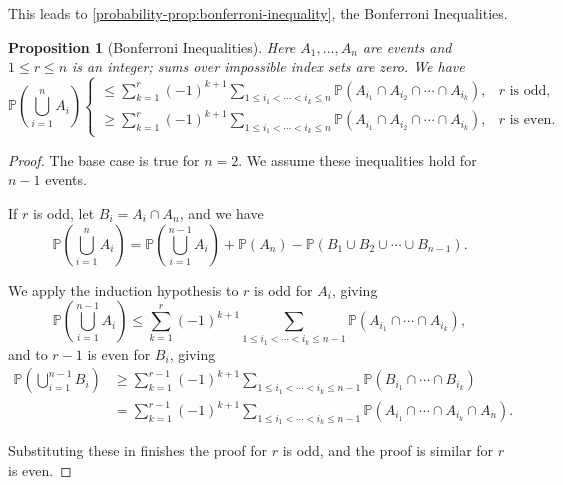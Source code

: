 \documentclass[11pt]{article}
\numberwithin{equation}{section}
\newtheorem{proposition}[theorem]{Proposition}
\theoremstyle{definition}
\theoremstyle{remark}
\newcommand{\pqty}[1]{\left(#1\right)}
\newcommand{\Prob}{\mathbb P}
\begin{document}
This leads to \autoref{probability-prop:bonferroni-inequality}, the Bonferroni Inequalities.

\begin{proposition}[Bonferroni Inequalities]\label{probability-proposition-004}
    \label{probability-prop:bonferroni-inequality}
Here \(A_1,\ldots,A_n\) are events and \(1\le r\le n\) is an integer; sums over impossible index sets are zero.
%
    We have
    \[
        \Prob\pqty{\bigcup_{i = 1}^{n} A_i} \begin{cases}
            \leq \sum_{k = 1}^{r} \pqty{-1}^{k + 1} \sum_{1 \leq i_1 < \cdots < i_k \leq n} \Prob\pqty{A_{i_1} \cap A_{i_2} \cap \cdots \cap A_{i_k}}, & r \text{ is odd}, \\
            \geq \sum_{k = 1}^{r} \pqty{-1}^{k + 1} \sum_{1 \leq i_1 < \cdots < i_k \leq n} \Prob\pqty{A_{i_1} \cap A_{i_2} \cap \cdots \cap A_{i_k}}, & r \text{ is even}.
        \end{cases}
    \]
\end{proposition}

\begin{proof}\label{probability-proof-012}
    The base case is true for \(n = 2\). We assume these inequalities hold for \(n - 1\) events.

    If \(r\) is odd, let \(B_i = A_i \cap A_n\), and we have
    \[
        \Prob\pqty{\bigcup_{i = 1}^{n} A_i} = \Prob\pqty{\bigcup_{i = 1}^{n - 1} A_i} + \Prob\pqty{A_n} - \Prob\pqty{B_1 \cup B_2 \cup \cdots \cup B_{n - 1}}.
    \]

    We apply the induction hypothesis to \(r\) is odd for \(A_i\), giving
    \[
        \Prob\pqty{\bigcup_{i = 1}^{n - 1} A_i} \leq \sum_{k = 1}^{r} \pqty{-1}^{k + 1} \sum_{1 \leq i_1 < \cdots < i_k \leq n - 1} \Prob\pqty{A_{i_1} \cap \cdots \cap A_{i_k}},
    \]
    and to \(r - 1\) is even for \(B_i\), giving
    \begin{align*}
        \Prob\pqty{\bigcup_{i = 1}^{n - 1} B_i} &\geq \sum_{k = 1}^{r - 1} \pqty{-1}^{k + 1} \sum_{1 \leq i_1 < \cdots < i_k \leq n - 1} \Prob\pqty{B_{i_1} \cap \cdots \cap B_{i_k}} \\
        &= \sum_{k = 1}^{r - 1} \pqty{-1}^{k + 1} \sum_{1 \leq i_1 < \cdots < i_k \leq n - 1} \Prob\pqty{A_{i_1} \cap \cdots \cap A_{i_k} \cap A_n}.
    \end{align*}

    Substituting these in finishes the proof for \(r\) is odd, and the proof is similar for \(r\) is even.
\end{proof}
\end{document}
